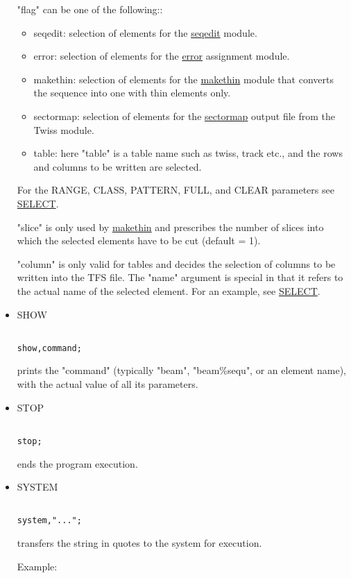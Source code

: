 \begin{itemize}
 "flag" can be one of the following:: 
\begin{itemize}
	\item seqedit: selection of elements for the  \href{seqedit.html}{seqedit} module. 
	\item error: selection of elements for the  \href{../error/error.html}{error} assignment module. 
	\item makethin: selection of elements for the  \href{../makethin/makethin.html}{makethin} module that converts the sequence into one with thin elements only. 
	\item sectormap: selection of elements for the  \href{../Introduction/sectormap.html}{sectormap} output file from the Twiss module. 
	\item table: here "table" is a table name such as twiss, track etc., and the rows and columns to be written are selected. 
\end{itemize} For the RANGE, CLASS, PATTERN, FULL, and CLEAR parameters see \href{../Introduction/select.html}{SELECT}. 

 "slice" is only used by \href{../makethin/makethin.html}{makethin} and prescribes the number of slices into which the selected elements have to be cut (default = 1). 

 "column" is only valid for tables and decides the selection of columns to be written into the TFS file. The "name" argument is special in that it refers to the actual name of the selected element. For an example, see \href{../Introduction/select.html}{SELECT}. 
	\item SHOW
\begin{verbatim}

show,command;
\end{verbatim} prints the "command" (typically "beam", "beam\%sequ", or an element name), with the actual value of all its parameters. 


	\item STOP
\begin{verbatim}

stop;
\end{verbatim} ends the program execution. 


	\item SYSTEM
\begin{verbatim}

system,"...";
\end{verbatim} transfers the string in quotes to the system for execution. 

 Example: 
\begin{verbatim}


\end{verbatim}
\end{itemize}
